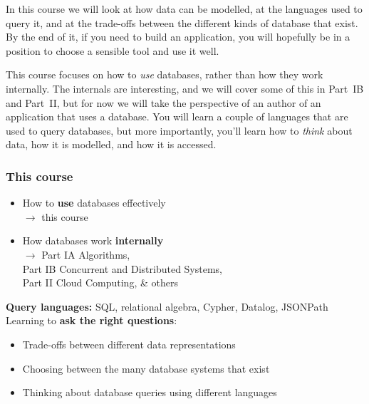 In this course we will look at how data can be modelled, at the languages used to query it, and at the trade-offs between the different kinds of database that exist.
By the end of it, if you need to build an application, you will hopefully be in a position to choose a sensible tool and use it well.

This course focuses on how to \emph{use} databases, rather than how they work internally.
The internals are interesting, and we will cover some of this in Part~IB and Part~II, but for now we will take the perspective of an author of an application that uses a database.
You will learn a couple of languages that are used to query databases, but more importantly, you'll learn how to \emph{think} about data, how it is modelled, and how it is accessed.

\begin{frame}
    \label{s:this-course}
    \frametitle{This course}
    \begin{itemize}
        \item How to \textbf{use} databases effectively\\
            $\rightarrow$ this course
        \item How databases work \textbf{internally}\\
            $\rightarrow$ Part IA Algorithms,\\
            Part IB Concurrent and Distributed Systems,\\
            Part II Cloud Computing, \& others\pause\\[1em]
    \end{itemize}
    \textbf{Query languages:} SQL, relational algebra, Cypher, Datalog, JSONPath\\[1em]\pause
    Learning to \textbf{ask the right questions}:
    \begin{itemize}
        \item Trade-offs between different data representations
        \item Choosing between the many database systems that exist
        \item Thinking about database queries using different languages
    \end{itemize}
\end{frame}
\label{l:this-course}

